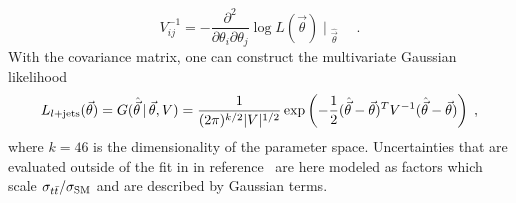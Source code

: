 

\begin{equation}
  V_{ij}^{-1} = - \frac{\partial^2 }{\partial \theta_i \partial \theta_j} \log L(\vec{\theta})\; {\bigg | \;}_{\hat{\vec{\theta}}} \; \quad .
\end{equation}
With the covariance matrix, one can construct the multivariate Gaussian likelihood 
\begin{equation} \label{eqn:ljetsLikelihood}
  L_{l+\rm jets}(\vec{\theta}) = G(\hat{\vec{\theta}}\, |\, \vec{\theta}, V) = \frac{1}{(2\pi)^{k/2} | V|^{1/2}} \exp\left( -\frac{1}{2} (\hat{\vec{\theta}} - \vec{\theta})^T  V^{-1} (\hat{\vec{\theta}} - \vec{\theta})  \right) \;, 
\end{equation}
where $k=46$ is the dimensionality of the parameter space.  
Uncertainties that are evaluated outside of the fit in in reference~\cite{LEPTON_JETS_NOTE_2011} are here modeled as factors which scale $\sigma_{t\bar{t}}/\sigma_{\rm SM}$ and are described by Gaussian terms.


